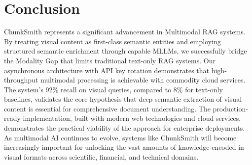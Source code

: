 \documentclass[conference]{IEEEtran}
\begin{document}
\section{Conclusion}
ChunkSmith represents a significant advancement in Multimodal RAG systems. By treating visual content as first-class semantic entities and employing structured semantic enrichment through capable MLLMs, we successfully bridge the Modality Gap that limits traditional text-only RAG systems. Our asynchronous architecture with API key rotation demonstrates that high-throughput multimodal processing is achievable with commodity cloud services.
The system's 92\% recall on visual queries, compared to 8\% for text-only baselines, validates the core hypothesis that deep semantic extraction of visual content is essential for comprehensive document understanding. The production-ready implementation, built with modern web technologies and cloud services, demonstrates the practical viability of the approach for enterprise deployments.
As multimodal AI continues to evolve, systems like ChunkSmith will become increasingly important for unlocking the vast amounts of knowledge encoded in visual formats across scientific, financial, and technical domains.

\end{document}
